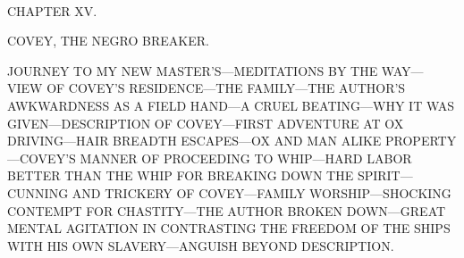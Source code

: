 {\protect\hypertarget{205}{}{}}

~

{CHAPTER XV.}

COVEY, THE NEGRO BREAKER.

{JOURNEY TO MY NEW MASTER'S---MEDITATIONS BY THE WAY---VIEW OF COVEY'S
RESIDENCE---THE FAMILY---THE AUTHOR'S AWKWARDNESS AS A FIELD HAND---A
CRUEL BEATING---WHY IT WAS GIVEN---DESCRIPTION OF COVEY---FIRST
ADVENTURE AT OX DRIVING---HAIR BREADTH ESCAPES---OX AND MAN ALIKE
PROPERTY---COVEY'S MANNER OF PROCEEDING TO WHIP---HARD LABOR BETTER THAN
THE WHIP FOR BREAKING DOWN THE SPIRIT---CUNNING AND TRICKERY OF
COVEY---FAMILY WORSHIP---SHOCKING CONTEMPT FOR CHASTITY---THE AUTHOR
BROKEN DOWN---GREAT MENTAL AGITATION IN CONTRASTING THE FREEDOM OF THE
SHIPS WITH HIS OWN SLAVERY---ANGUISH BEYOND DESCRIPTION.}

